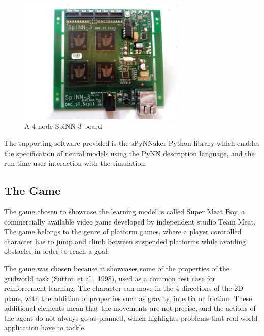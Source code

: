 \documentclass[10pt]{article}
\begin{document}
    \begin{figure}[ht!]
    \centering
    \includegraphics[width=80mm]{./SpiNN-3.jpg}
    \caption{A 4-node SpiNN-3 board \label{overflow}}
    \label{fig:spinnBoard}
    \end{figure}

    \setcounter{figure}{2}

    The supporting software provided is the sPyNNaker Python library which enables the specification of neural models using the PyNN description language, and the run-time user interaction with the simulation.

    \subsection{The Game}

    The game chosen to showcase the learning model is called Super Meat Boy, a commercially available video game developed by independent studio Team Meat. The game belongs to the genre of platform games, where a player controlled character has to jump and climb between suspended platforms while avoiding obstacles in order to reach a goal.   

    The game was chosen because it showcases some of the properties of the gridworld task (Sutton et al., 1998), used as a common test case for reinforcement learning. The character can move in the 4 directions of the 2D plane, with the addition of properties such as gravity, intertia or friction. These additional elements mean that the movements are not precise, and the actions of the agent do not always go as planned, which highlights problems that real world application have to tackle.
\end{document}
